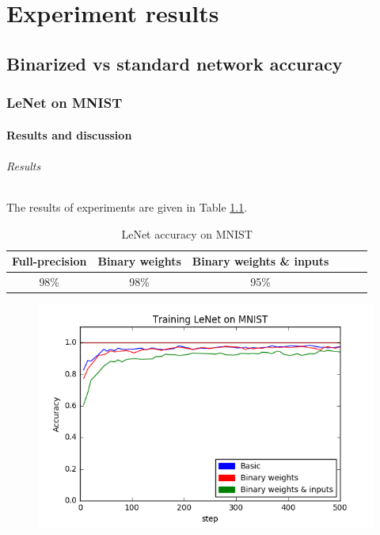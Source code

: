 \documentclass[licencjacka]{pracamgr}
\begin{document}
	
\part{Experiment results}
\chapter{Binarized vs standard network accuracy}

	\section{LeNet on MNIST}
		\subsection{Results and discussion}
		        \paragraph{Results} 
		     
		        The results of experiments are  given in Table \ref{table:0}.
		        \begin{table}[H]
                    \caption{LeNet accuracy on MNIST}
                    \centering
                    \begin{tabular}{c c c c c c}
                    \hline\hline
			    Full-precision & Binary weights & Binary weights \& inputs \\ [0.5ex]
                    \hline
			    98\% & 98\% & 95\% \\
                    \hline
                    \end{tabular}
                    \label{table:0}
	            \end{table}
	            \begin{figure}[h]
				\centering
				\includegraphics[width=\textwidth]{images/LeNet-training}
			\end{figure}
\end{document}
